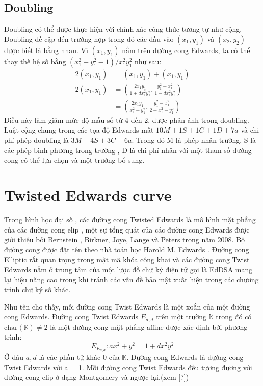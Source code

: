 \documentclass[a4paper,12pt]{report}
\begin{document}
\subsection*{Doubling}
Doubling có thể được thực hiện với chính xác công thức tương tự như cộng. Doubling đề cập đến trường hợp trong đó các đầu vào $(x_1, y_1)$ và $(x_2, y_2)$ được biết là bằng nhau. Vì $(x_1, y_1)$ nằm trên đường cong Edwards, ta có thể thay thế hệ số bằng $(x_1^2 + y_1^2  - 1)/x_1^2y_1^2$ như sau:
\begin{displaymath}
{\begin{aligned}2(x_{1},y_{1})&=(x_{1},y_{1})+(x_{1},y_{1})\\[6pt]2(x_{1},y_{1})&=\left({\frac  {2x_{1}y_{1}}{1+dx_{1}^{2}y_{1}^{2}}},{\frac  {y_{1}^{2}-x_{1}^{2}}{1-dx_{1}^{2}y_{1}^{2}}}\right)\\[6pt]&=\left({\frac  {2x_{1}y_{1}}{x_{1}^{2}+y_{1}^{2}}},{\frac  {y_{1}^{2}-x_{1}^{2}}{2-x_{1}^{2}-y_{1}^{2}}}\right)\end{aligned}}
\end{displaymath}
Điều này làm giảm mức độ mẫu số từ 4 đến 2, được phản ánh trong doubling. Luật cộng chung trong các tọa độ Edwards mất $10M + 1S + 1C + 1D + 7a$ và chi phí phép doubling là $3M + 4S + 3C + 6a$. Trong đó M là phép nhân trường, S là các phép bình phương trong trường , D là chi phí nhân với một tham số đường cong có thể lựa chọn và một trường bổ sung.
\section{Twisted Edwards curve}
Trong hình học đại số , các đường cong Twisted Edwards là mô hình mặt phẳng của các đường cong elip , một sự tổng quát của các đường cong Edwards được giới thiệu bởi Bernstein , Birkner, Joye, Lange và Peters trong năm 2008. Bộ đường cong được đặt tên theo nhà toán học Harold M. Edwards . Đường cong Elliptic rất quan trọng trong mật mã khóa công khai và các đường cong Twist Edwards nằm ở trung tâm của một lược đồ chữ ký điện tử  gọi là EdDSA mang lại hiệu năng cao trong khi tránh các vấn đề bảo mật xuất hiện trong các chương trình chữ ký số khác.

Như tên cho thấy, mỗi đường cong Twist Edwards là một xoắn của một đường cong Edwards. Đường cong Twist Edwards $E_{a, d}$ trên một trường $\displaystyle \mathbb{K}$ trong đó có $\displaystyle \mathrm{char}(\mathbb{K}) \neq 2$ là một đường cong mặt phẳng affine được xác định bởi phương trình:
\begin{displaymath}
E_{E_{a,d}}: ax^2 + y^2 = 1 + dx^2y^2
\end{displaymath}
Ở đâu $a, d$ là các phần tử khác 0 của $\displaystyle \mathbb{K}$. Đường cong Edwards là đường cong Twist Edwards với a = 1.
Mỗi đường cong Twist Edwards đều tương đương với đường cong elip ở dạng Montgomery và ngược lại.(xem [?])
\end{document}
